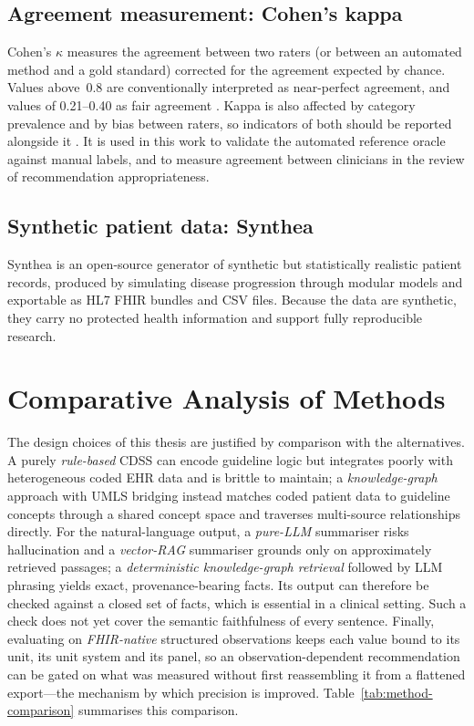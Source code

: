 \subsection{Agreement measurement: Cohen's kappa}
Cohen's $\kappa$ \cite{cohen1960} measures the agreement between two raters (or between an
automated method and a gold standard) corrected for the agreement expected by chance. Values
above~0.8 are conventionally interpreted as near-perfect agreement, and values of 0.21--0.40
as fair agreement \cite{landis1977}. Kappa is
also affected by category prevalence and by bias between raters, so indicators of both should
be reported alongside it \cite{byrt1993}. It is used in this work to
validate the automated reference oracle against manual labels, and to measure agreement
between clinicians in the review of recommendation appropriateness.

\subsection{Synthetic patient data: Synthea}
Synthea \cite{synthea} is an open-source generator of synthetic but statistically realistic
patient records, produced by simulating disease progression through modular models and
exportable as HL7 FHIR bundles and CSV files. Because the data are synthetic, they carry no
protected health information and support fully reproducible research.

\section{Comparative Analysis of Methods}

The design choices of this thesis are justified by comparison with the alternatives. A purely
\emph{rule-based} CDSS can encode guideline logic but integrates poorly with heterogeneous
coded EHR data and is brittle to maintain; a \emph{knowledge-graph} approach with UMLS
bridging instead matches coded patient data to guideline concepts through a shared concept
space and traverses multi-source relationships directly. For the natural-language output, a
\emph{pure-LLM} summariser risks hallucination and a \emph{vector-RAG} summariser grounds only
on approximately retrieved passages; a \emph{deterministic knowledge-graph retrieval} followed
by LLM phrasing yields exact, provenance-bearing facts. Its output can therefore be checked
against a closed set of facts, which is essential in a clinical setting. Such a check does not
yet cover the semantic faithfulness of every sentence. Finally, evaluating on
\emph{FHIR-native} structured observations keeps each value bound to its unit, its unit system
and its panel, so an observation-dependent recommendation can be gated on what was measured
without first reassembling it from a flattened export---the mechanism by which precision is
improved. Table~\ref{tab:method-comparison} summarises this comparison.

